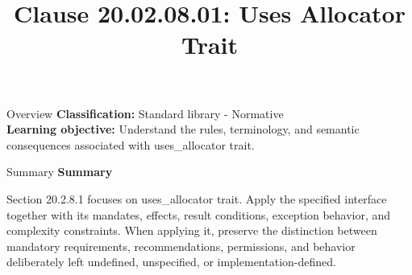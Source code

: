 \documentclass[10pt,letterpaper]{article}
\title{Clause 20.02.08.01: Uses Allocator Trait}
\author{}
\date{}
\begin{document}
\maketitle
\begin{CornellOverviewBox}{Overview}
\textbf{Classification:} Standard library - Normative\\[2pt]
\textbf{Learning objective:} Understand the rules, terminology, and semantic consequences associated with uses\_allocator trait.
\end{CornellOverviewBox}\begin{CornellSummaryBox}{Summary}
{\sffamily\bfseries\color{Accent} Summary}\par\vspace{3pt}Section 20.2.8.1 focuses on uses\_allocator trait. Apply the specified interface together with its mandates, effects, result conditions, exception behavior, and complexity constraints. When applying it, preserve the distinction between mandatory requirements, recommendations, permissions, and behavior deliberately left undefined, unspecified, or implementation-defined.
\end{CornellSummaryBox}
\end{document}
